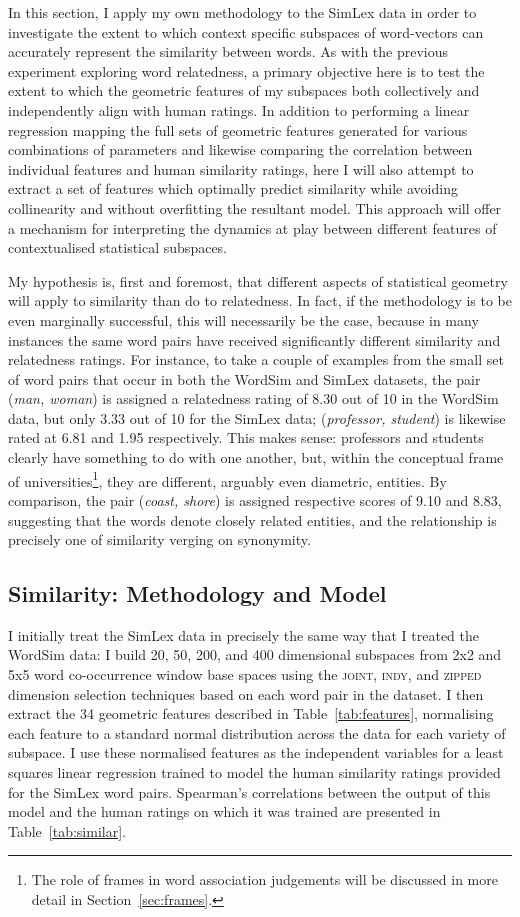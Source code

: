 In this section, I apply my own methodology to the SimLex data in order to investigate the extent to which context specific subspaces of word-vectors can accurately represent the similarity between words.  As with the previous experiment exploring word relatedness, a primary objective here is to test the extent to which the geometric features of my subspaces both collectively and independently align with human ratings.  In addition to performing a linear regression mapping the full sets of geometric features generated for various combinations of parameters and likewise comparing the correlation between individual features and human similarity ratings, here I will also attempt to extract a set of features which optimally predict similarity while avoiding collinearity and without overfitting the resultant model.  This approach will offer a mechanism for interpreting the dynamics at play between different features of contextualised statistical subspaces.

My hypothesis is, first and foremost, that different aspects of statistical geometry will apply to similarity than do to relatedness.  In fact, if the methodology is to be even marginally successful, this will necessarily be the case, because in many instances the same word pairs have received significantly different similarity and relatedness ratings.  For instance, to take a couple of examples from the small set of word pairs that occur in both the WordSim and SimLex datasets, the pair (\emph{man, woman}) is assigned a relatedness rating of 8.30 out of 10 in the WordSim data, but only 3.33 out of 10 for the SimLex data; (\emph{professor, student}) is likewise rated at 6.81 and 1.95 respectively.  This makes sense: professors and students clearly have something to do with one another, but, within the conceptual frame of universities\footnote{The role of frames in word association judgements will be discussed in more detail in Section~\ref{sec:frames}.}, they are different, arguably even diametric, entities.  By comparison, the pair (\emph{coast, shore}) is assigned respective scores of 9.10 and 8.83, suggesting that the words denote closely related entities, and the relationship is precisely one of similarity verging on synonymity.

\subsection{Similarity: Methodology and Model}
I initially treat the SimLex data in precisely the same way that I treated the WordSim data: I build 20, 50, 200, and 400 dimensional subspaces from 2x2 and 5x5 word co-occurrence window base spaces using the \textsc{joint}, \textsc{indy}, and \textsc{zipped} dimension selection techniques based on each word pair in the dataset.  I then extract the 34 geometric features described in Table~\ref{tab:features}, normalising each feature to a standard normal distribution across the data for each variety of subspace.  I use these normalised features as the independent variables for a least squares linear regression trained to model the human similarity ratings provided for the SimLex word pairs.  Spearman's correlations between the output of this model and the human ratings on which it was trained are presented in Table~\ref{tab:similar}.

